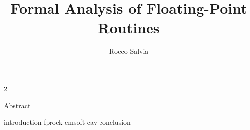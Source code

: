 \documentclass[11pt,Chicago]{uuthesis2e}
\author                 {Rocco Salvia}
\title                  {Formal Analysis of Floating-Point Routines}
\begin{document}
\frontmatterformat
\titlepage
\copyrightpage
\dissertationapproval
\setcounter {page}     {2}             %

 {Abstract}
\tableofcontents
\listoffigures





\maintext       %

\pagestyle{plain}
\pagestyle{headings}

 {introduction}
 {fprock}
 {emsoft}
 {cav}
 {conclusion}

\newpage

\end{document}
